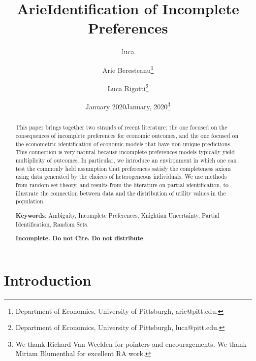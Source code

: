 \documentclass[reqno]{article}
\title{Arie}
\author{luca}
\date{January 2020}
\begin{document}
\title{Identification of Incomplete Preferences}
\author{Arie Beresteanu\thanks{%
Department of Economics, University of Pittsburgh, arie@pitt.edu. } \and %
Luca Rigotti\thanks{%
Department of Economics, University of Pittsburgh, luca@pitt.edu.}}
\date{January, 2020\thanks{%
We thank Richard Van Weelden for pointers and encouragements. We thank
Miriam Blumenthal for excellent RA work.}}
\maketitle

\begin{abstract}
This paper brings together two strands of recent literature: the one focused
on the consequences of incomplete preferences for economic outcomes, and the
one focused on the econometric identification of economic models that have
non-unique predictions. This connection is very natural because incomplete
preferences models typically yield multiplicity of outcomes. In particular,
we introduce an environment in which one can test the commonly held
assumption that preferences satisfy the completeness axiom using data
generated by the choices of heterogeneous individuals. We use methods from
random set theory, and results from the literature on partial
identification, to illustrate the connection between data and the
distribution of utility values in the population.

\bigskip

\noindent \textbf{Keywords}: Ambiguity, Incomplete Preferences, Knightian
Uncertainty, Partial Identification, Random Sets.

\bigskip

\textbf{Incomplete. Do not Cite. Do not distribute}.
\end{abstract}

\thispagestyle{empty}

\setlength{\baselineskip}{.26in}\newpage

\setcounter{page}{1}


\section{Introduction}
\label{introduction}
\end{document}
